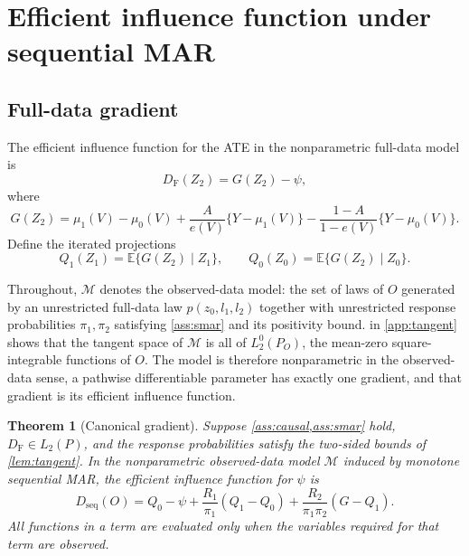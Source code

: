 \documentclass[11pt]{article}
\newtheorem{theorem}{Theorem}
\theoremstyle{definition}
\newcommand{\E}{\mathbb{E}}
\newcommand{\1}{\mathbf{1}}
\newcommand{\seq}{\mathrm{seq}}
\newcommand{\F}{\mathrm{F}}
\begin{document}
\section{Efficient influence function under sequential MAR}

\subsection{Full-data gradient}

The efficient influence function for the ATE in the nonparametric full-data model is
\begin{equation}\label{eq:full-eif}
D_{\F}(Z_2)=G(Z_2)-\psi,
\end{equation}
where
\begin{equation}\label{eq:G}
G(Z_2)=\mu_1(V)-\mu_0(V)
+\frac{A}{e(V)}\{Y-\mu_1(V)\}
-\frac{1-A}{1-e(V)}\{Y-\mu_0(V)\}.
\end{equation}
Define the iterated projections
\begin{equation}\label{eq:Qs}
Q_1(Z_1)=\E\{G(Z_2)\mid Z_1\},\qquad
Q_0(Z_0)=\E\{G(Z_2)\mid Z_0\}.
\end{equation}

Throughout, $\mathcal M$ denotes the observed-data model: the set of laws of
$O$ generated by an unrestricted full-data law $p(z_0,l_1,l_2)$ together with
unrestricted response probabilities $\pi_1,\pi_2$ satisfying \cref{ass:smar}
and its positivity bound.  in \cref{app:tangent} shows that
the tangent space of $\mathcal M$ is all of $L_2^0(P_O)$, the mean-zero square-integrable
functions of $O$. The model is therefore nonparametric in the observed-data
sense, a pathwise differentiable parameter has exactly one gradient, and that
gradient is its efficient influence function.

\begin{theorem}[Canonical gradient]\label{thm:eif}
Suppose \cref{ass:causal,ass:smar} hold, $D_{\F}\in L_2(P)$, and the response
probabilities satisfy the two-sided bounds of \cref{lem:tangent}. In the
nonparametric observed-data model $\mathcal M$ induced by monotone sequential
MAR, the efficient influence function for $\psi$ is
\begin{equation}\label{eq:seq-eif}
\boxed{
D_{\seq}(O)=Q_0-\psi
+\frac{R_1}{\pi_1}(Q_1-Q_0)
+\frac{R_2}{\pi_1\pi_2}(G-Q_1).}
\end{equation}
All functions in a term are evaluated only when the variables required for that term are observed.
\end{theorem}
\end{document}
